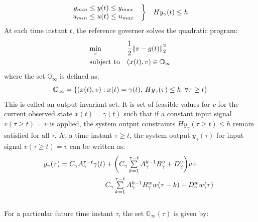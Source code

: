 \documentclass[letterpaper, 10 pt, conference]{ieeeconf}  %
\newcommand{\norm}[1]{\left\lVert#1\right\rVert}
\begin{document}
\begin{enumerate}
\begin{equation*}
\begin{matrix}
\begin{matrix}
	y_{min} \leq y(t) \leq y_{max} \\
	u_{min} \leq u(t) \leq u_{max}
	\end{matrix} & \bigg{\}} & Hy_{\gamma}(t) \leq h
	\end{matrix}
	\end{equation*}
	At each time instant $t$, the reference governer solves the quadratic program:
	\begin{equation}
	\begin{aligned}
	& \underset{v}{\text{min}}
	& & \cfrac{1}{2}\norm{v-g(t)}_2^2 \\
	& \text{subject to}
	& & 
	(x(t),v) \in \mathbb{O}_{\infty}
	\end{aligned}
	\label{RGprob}
	\end{equation}
	where the set $\mathbb{O}_{\infty}$ is defined as:
	\begin{equation*}
	\mathbb{O}_{\infty} = \{(x(t),v): x(t) = \gamma(t), \hspace{2pt} Hy_{\gamma}(\tau) \leq h \hspace{5pt} \forall \tau \geq t \} \\ 
	\end{equation*}
	This is called an output-invariant set.
	It is set of feasible values for $v$ for the current observed state $x(t)=\gamma(t)$ such that if a constant input signal $v(\tau \geq t)=v$ is applied, the system output constraints $Hy_{\gamma}(\tau \geq t) \leq h$ remain satisfied for all $\tau$.
	At a time instant $\tau \geq t$, the system output $y_{\gamma}(\tau)$ for input signal $v(\tau \geq t)=v$ can be written as:
	\begin{equation*}
	\hspace{-30pt}
	\begin{aligned}
	\begin{matrix}
	y_{\gamma}(\tau) = C_{\gamma}A_{\gamma}^{\tau - t}\gamma(t) + \bigg( C_{\gamma}\sum\limits_{k=1}^{\tau - t}A_{\gamma}^{k-1}B^v_{\gamma} + D_{\gamma}^v \bigg)v + \vspace{5pt}\\  \hspace{110pt} C_{\gamma}\sum\limits_{k=1}^{\tau - t}A_{\gamma}^{k-1}B^w_{\gamma}w(\tau-k) + D_{\gamma}^w w(\tau)
	\end{matrix}
	\end{aligned}
	\end{equation*} \\
	For a particular future time instant $\tau$, the set $\mathbb{O}_{\infty}(\tau)$ is given by:
	\begin{equation*}

\end{equation*}
\end{enumerate}
\end{document}
